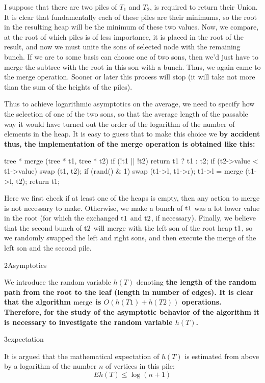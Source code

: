 I suppose that there are two piles of $T_1$ and $T_2$, is required to return their Union. It is clear that fundamentally each of these piles are their minimums, so the root in the resulting heap will be the minimum of these two values. Now, we compare, at the root of which piles is of less importance, it is placed in the root of the result, and now we must unite the sons of selected node with the remaining bunch. If we are to some basis can choose one of two sons, then we'd just have to merge the subtree with the root in this son with a bunch. Thus, we again came to the merge operation. Sooner or later this process will stop (it will take not more than the sum of the heights of the piles).

Thus to achieve logarithmic asymptotics on the average, we need to specify how the selection of one of the two sons, so that the average length of the passable way it would have turned out the order of the logarithm of the number of elements in the heap. It is easy to guess that to make this choice we \bf{by accident} thus, the implementation of the merge operation is obtained like this:

\code
tree * merge (tree * t1, tree * t2) {
if (!t1 || !t2)
return t1 ? t1 : t2;
if (t2->value < t1->value)
swap (t1, t2);
if (rand() & 1)
swap (t1->l, t1->r);
t1->l = merge (t1->l, t2);
return t1;
}
\endcode

Here we first check if at least one of the heaps is empty, then any action to merge is not necessary to make. Otherwise, we make a bunch of $\rm t1$ was a lot lower value in the root (for which the exchanged $\rm t1$ and $\rm t2$, if necessary). Finally, we believe that the second bunch of $\rm t2$ will merge with the left son of the root heap $\rm t1$, so we randomly swapped the left and right sons, and then execute the merge of the left son and the second pile.

\h2{Asymptotics}

We introduce the random variable $h(T)$ denoting \bf{the length of the random path} from the root to the leaf (length in number of edges). It is clear that the algorithm $\rm merge$ is $O(h(T1)+h(T2))$ operations. Therefore, for the study of the asymptotic behavior of the algorithm it is necessary to investigate the random variable $h(T)$.

\h3{expectation}

It is argued that the mathematical expectation of $h(T)$ is estimated from above by a logarithm of the number $n$ of vertices in this pile:
$$ Eh(T) \le \log(n+1) $$

